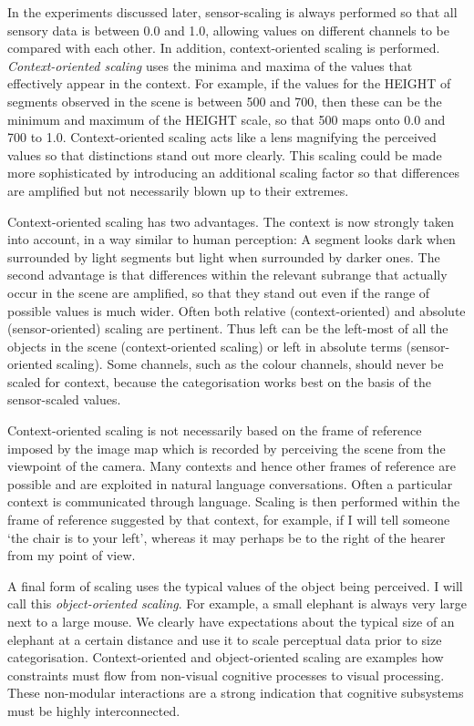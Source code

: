 In the experiments discussed later, 
sensor-scaling is always performed so that all sensory data
is between 0.0 and 1.0, allowing values on different channels 
to be compared with 
each other. In addition, context-oriented scaling is performed.
{\itshape Context-oriented scaling} uses the minima and maxima of the 
values that effectively appear in the context.
For example, if the values for the HEIGHT of segments 
observed in the scene is between 500 and 700, 
then these can be the minimum and maximum of the 
HEIGHT scale, so that 500 maps onto 0.0 and 700 to 1.0. 
Context-oriented scaling acts like a lens
magnifying the perceived values so that distinctions
stand out more clearly. This scaling could 
be made more sophisticated by introducing an additional scaling factor so that 
differences are amplified but not necessarily blown up to their extremes. 

Context-oriented scaling has two advantages. The 
context is now strongly taken into
account, in a way similar to human perception: A segment
looks dark when surrounded by light segments but
light when surrounded by darker ones. The second advantage is 
that differences within the relevant subrange that 
actually occur in the scene are amplified, so that 
they stand out even if the range of possible values is
much wider. Often both relative (context-oriented) 
and absolute (sensor-oriented) scaling 
are pertinent. Thus left can be
the left-most of all the objects in the scene (context-oriented
scaling) or left in absolute terms (sensor-oriented scaling). 
Some channels, such as the colour channels, should never be scaled
for context, because the categorisation works best on the basis of 
the sensor-scaled values. 

Context-oriented scaling is not necessarily based on the 
frame of reference imposed by the image map which is 
recorded by perceiving the scene from the viewpoint of 
the camera. Many contexts and hence other frames of reference
are possible and are exploited in natural language 
conversations. Often a particular context is communicated through 
language. Scaling is then performed within the
frame of reference suggested by that context, 
for example, if I will tell someone `the chair is to
your left', whereas it may perhaps be to the right of the
hearer from my point of view. 

A final form of scaling uses the typical values of the object being 
perceived. I will call this {\itshape object-oriented scaling}. 
For example, a small elephant is always
very large next to a large mouse. We clearly
have expectations about the typical size of an elephant at
a certain distance and use it to scale
perceptual data prior to size 
categorisation. Context-oriented and object-oriented scaling
are examples how constraints must flow 
from non-visual cognitive processes to visual processing. 
These non-modular interactions are a strong
indication that cognitive subsystems must be highly 
interconnected. 

